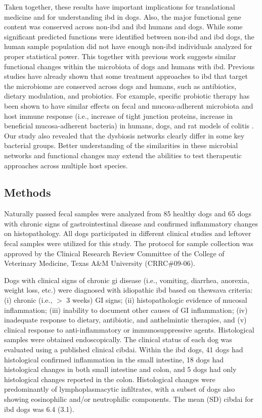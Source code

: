 Taken together, these results have important implications for translational medicine and for understanding \gls{ibd} in dogs. Also, the major functional gene content was conserved across non-\gls{ibd} and \gls{ibd} humans and dogs. While some significant predicted functions were identified between non-\gls{ibd} and \gls{ibd} dogs, the human sample population did not have enough non-\gls{ibd} individuals analyzed for proper statistical power. This together with previous work suggests similar functional changes within the microbiota of dogs and humans with \gls{ibd}. Previous studies have already shown that some treatment approaches to \gls{ibd} that target the microbiome are conserved across dogs and humans, such as antibiotics, dietary modulation, and probiotics. For example, specific probiotic therapy has been shown to have similar effects on fecal and mucosa-adherent microbiota and host immune response (i.e., increase of tight junction proteins, increase in beneficial mucosa-adherent bacteria) in humans, dogs, and rat models of colitis \cite{RN17583, RN17357, RN158}. 
Our study also revealed that the dysbiosis networks clearly differ in some key bacterial groups. Better understanding of the similarities in these microbial networks and functional changes may extend the abilities to test therapeutic approaches across multiple host species.

\subsection{Methods}

Naturally passed fecal samples were analyzed from 85 healthy dogs and 65 dogs with chronic signs of gastrointestinal disease and confirmed inflammatory changes on histopathology. All dogs participated in different clinical studies and leftover fecal samples were utilized for this study. The protocol for sample collection was approved by the Clinical Research Review Committee of the College of Veterinary Medicine, Texas A\&M University (CRRC\#09-06). 

Dogs with clinical signs of chronic \gls{gi} disease (i.e., vomiting, diarrhea, anorexia, weight loss, etc.) were diagnosed with idiopathic \gls{ibd} based on the\gls{wsava} criteria: (i) chronic (i.e., $>$ 3 weeks) GI signs; (ii) histopathologic evidence of mucosal inflammation; (iii) inability to document other causes of GI inflammation; (iv) inadequate response to dietary, antibiotic, and anthelmintic therapies, and (v) clinical response to anti-inflammatory or immunosuppressive agents.  Histological samples were obtained endoscopically. The clinical status of each dog was evaluated using a published clinical \gls{cibdai}. Within the \gls{ibd} dogs, 41 dogs had histological confirmed inflammation in the small intestine, 18 dogs had histological changes in both small intestine and colon, and 5 dogs had only histological changes reported in the colon. Histological changes were predominantly of lymphoplasmacytic infiltrates, with a subset of dogs also showing eosinophilic and/or neutrophilic components. The mean (SD) \gls{cibdai} for \gls{ibd} dogs was 6.4 (3.1).

